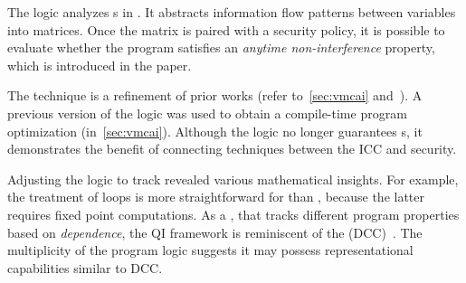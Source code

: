 The logic analyzes s in . It
abstracts information flow patterns between variables into matrices. Once the
matrix is paired with a security policy, it is
possible to evaluate whether the program satisfies an \emph{anytime
non-interference} property, which is introduced
in the paper.

The technique is a refinement of prior works (refer to~\autoref{sec:vmcai}
and~\cite{moyen20172}). A previous version of the logic was used to obtain a
compile-time program optimization (in~\autoref{sec:vmcai}). Although the logic
no longer guarantees s, it demonstrates the benefit of
connecting techniques between the ICC and security.

Adjusting the logic to track  revealed various
mathematical insights. For example, the treatment of loops is more
straightforward for  than ,
because the latter requires fixed point computations. As a , that tracks different program properties based on
\emph{dependence}, the QI framework is reminiscent of the
 (DCC)~\cite{abadi1999b}. The multiplicity of the
program logic suggests it may possess representational capabilities similar to
DCC\@.
